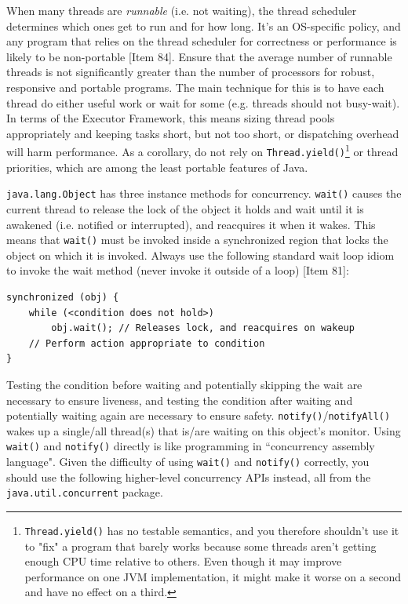 \documentclass[table, xcdraw]{article}%
\begin{document}
When many threads are \emph{runnable} (i.e. not waiting), the thread scheduler determines which ones get to run and for how long. It's an OS-specific policy, and any program that relies on the thread scheduler for correctness or performance is likely to be non-portable [Item 84]. Ensure that the average number of runnable threads is not significantly greater than the number of processors for robust, responsive and portable programs. The main technique for this is to have each thread do either useful work or wait for some (e.g. threads should not busy-wait). In terms of the Executor Framework, this means sizing thread pools appropriately and keeping tasks short, but not too short, or dispatching overhead will harm performance. As a corollary, do not rely on \texttt{Thread.yield()}\footnote{\texttt{Thread.yield()} has no testable semantics, and you therefore shouldn't use it to "fix" a program that barely works because some threads aren’t getting enough CPU time relative to others. Even though it may improve performance on one JVM implementation, it might make it worse on a second and have no effect on a third.} or thread priorities, which are among the least portable features of Java.

\texttt{java.lang.Object} has three instance methods for concurrency. \texttt{wait()} causes the current thread to release the lock of the object it holds and wait until it is awakened (i.e. notified or interrupted), and reacquires it when it wakes. This means that \texttt{wait()} must be invoked inside a synchronized region that locks the object on which it is invoked. Always use the following standard wait loop idiom to invoke the wait method (never invoke it outside of a loop) [Item 81]:

\begin{verbatim}
synchronized (obj) {
    while (<condition does not hold>)
        obj.wait(); // Releases lock, and reacquires on wakeup
    // Perform action appropriate to condition
}
\end{verbatim}

Testing the condition before waiting and potentially skipping the wait are necessary to ensure liveness, and testing the condition after waiting and potentially waiting again are necessary to ensure safety. \texttt{notify()}/\texttt{notifyAll()} wakes up a single/all thread(s) that is/are waiting on this object's monitor. Using \texttt{wait()} and \texttt{notify()} directly is like programming in “concurrency assembly language". Given the difficulty of using \texttt{wait()} and \texttt{notify()} correctly, you should use the following higher-level concurrency APIs instead, all from the \texttt{java.util.concurrent} package.
\end{document}
